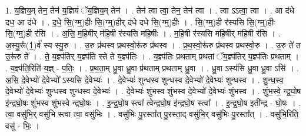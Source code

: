 \documentclass[17pt]{extarticle}
\begin{document}
1. य॒ज्ञिय॒म् तेन॒ तेन॑ य॒ज्ञियं॑ ॅय॒ज्ञिय॒म् तेन॑ । . तेन॑ त्वा त्वा॒ तेन॒ तेन॑ त्वा । . त्वा ऽऽत्वा॒ त्वा । . आ द॑धे दध॒ आ द॑धे । . द॒धे॒ सि॒(ग्म्॒)हीः सि॒(ग्म्॒)हीर् द॑धे दधे सि॒(ग्म्॒)हीः । . सि॒(ग्म्॒)ही र॑स्यसि सि॒(ग्म्॒)हीः सि॒(ग्म्॒)ही र॑सि । . अ॒सि॒ म॒हि॒षीर् म॑हि॒षी र॑स्यसि महि॒षीः । . म॒हि॒षी र॑स्यसि महि॒षीर् म॑हि॒षी र॑सि । . अ॒स्यु॒रू᳚(1॒)र्व॑ स्य स्यु॒रु । . उ॒रु प्र॑थस्व प्रथस्वो॒रू॑रु प्र॑थस्व । . प्र॒थ॒स्वो॒रू॑रु प्र॑थस्व प्रथस्वो॒रु । . उ॒रु ते॑ त उ॒रू॑रु ते᳚ । . ते॒ य॒ज्ञ्प॑तिर् य॒ज्ञ्प॑ति स्ते ते य॒ज्ञ्प॑तिः । . य॒ज्ञ्प॑तिः प्रथताम् प्रथतां ॅय॒ज्ञ्प॑तिर् य॒ज्ञ्प॑तिः प्रथताम् । . य॒ज्ञ्प॑ति॒रिति॑ य॒ज्ञ् - प॒तिः॒ । . प्र॒थ॒ता॒म् ध्रु॒वा ध्रु॒वा प्र॑थताम् प्रथताम् ध्रु॒वा । . ध्रु॒वा ऽस्य॑सि ध्रु॒वा ध्रु॒वा ऽसि॑ । . अ॒सि॒ दे॒वेभ्यो॑ दे॒वेभ्यो᳚ ऽस्यसि दे॒वेभ्यः॑ । . दे॒वेभ्यः॑ शुन्धस्व शुन्धस्व दे॒वेभ्यो॑ दे॒वेभ्यः॑ शुन्धस्व । . शु॒न्ध॒स्व॒ दे॒वेभ्यो॑ दे॒वेभ्यः॑ शुन्धस्व शुन्धस्व दे॒वेभ्यः॑ । . दे॒वेभ्यः॑ शुंभस्व शुंभस्व दे॒वेभ्यो॑ दे॒वेभ्यः॑ शुंभस्व । . शुं॒भ॒स्वे॒ न्द्र॒घो॒ष इ॑न्द्रघो॒षः शुं॑भस्व शुंभस्वे न्द्रघो॒षः । . इ॒न्द्र॒घो॒ष स्त्वा᳚ त्वेन्द्रघो॒ष इ॑न्द्रघो॒ष स्त्वा᳚ । . इ॒न्द्र॒घो॒ष इती᳚न्द्र - घो॒षः । . त्वा॒ वसु॑भि॒र् वसु॑भि स्त्वा त्वा॒ वसु॑भिः । . वसु॑भिः पु॒रस्ता᳚त् पु॒रस्ता॒द् वसु॑भि॒र् वसु॑भिः पु॒रस्ता᳚त् । . वसु॑भि॒रिति॒ वसु॑ - भिः॒ । \newline
\end{document}
